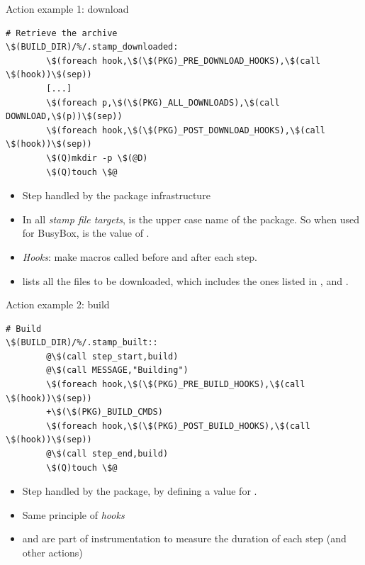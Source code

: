 \begin{frame}[fragile]{Action example 1: download}

\begin{block}{}
\begin{verbatim}
# Retrieve the archive
\$(BUILD_DIR)/%/.stamp_downloaded:
        \$(foreach hook,\$(\$(PKG)_PRE_DOWNLOAD_HOOKS),\$(call \$(hook))\$(sep))
        [...]
        \$(foreach p,\$(\$(PKG)_ALL_DOWNLOADS),\$(call DOWNLOAD,\$(p))\$(sep))
        \$(foreach hook,\$(\$(PKG)_POST_DOWNLOAD_HOOKS),\$(call \$(hook))\$(sep))
        \$(Q)mkdir -p \$(@D)
        \$(Q)touch \$@
\end{verbatim}
\end{block}

\begin{itemize}
\item Step handled by the package infrastructure
\item In all {\em stamp file targets},  is the upper case
  name of the package. So when used for BusyBox,
   is the value of .
\item {\em Hooks}: make macros called before and after each step.
\item {} lists all the files to be downloaded,
  which includes the ones listed in ,
   and .
\end{itemize}

\end{frame}

\begin{frame}[fragile]{Action example 2: build}

\begin{block}{}
\begin{verbatim}
# Build
\$(BUILD_DIR)/%/.stamp_built::
        @\$(call step_start,build)
        @\$(call MESSAGE,"Building")
        \$(foreach hook,\$(\$(PKG)_PRE_BUILD_HOOKS),\$(call \$(hook))\$(sep))
        +\$(\$(PKG)_BUILD_CMDS)
        \$(foreach hook,\$(\$(PKG)_POST_BUILD_HOOKS),\$(call \$(hook))\$(sep))
        @\$(call step_end,build)
        \$(Q)touch \$@
\end{verbatim}
\end{block}

\begin{itemize}
\item Step handled by the package, by defining a value for
  .
\item Same principle of {\em hooks}
\item {} and  are part of
  instrumentation to measure the duration of each step (and other
  actions)
\end{itemize}

\end{frame}


